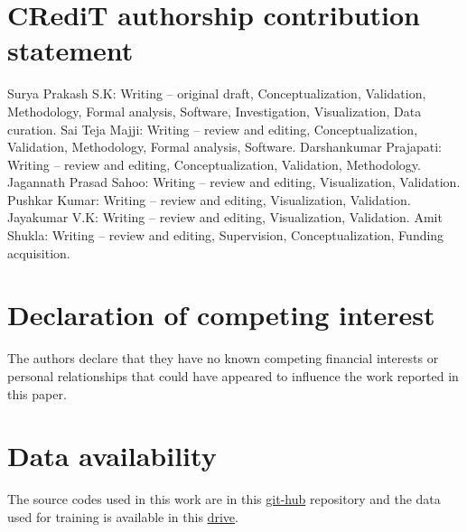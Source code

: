 \documentclass[preprint,12pt]{elsarticle}
\begin{document}
\section*{CRediT authorship contribution statement}
Surya Prakash S.K: Writing – original draft, Conceptualization, Validation, Methodology, Formal analysis, Software, Investigation, Visualization, Data curation. Sai Teja Majji: Writing – review and editing, Conceptualization, Validation, Methodology, Formal analysis, Software. Darshankumar Prajapati: Writing – review and editing, Conceptualization, Validation, Methodology. Jagannath Prasad Sahoo: Writing – review and editing, Visualization, Validation. Pushkar Kumar: Writing – review and editing, Visualization, Validation. Jayakumar V.K: Writing – review and editing, Visualization, Validation. Amit Shukla: Writing – review and editing, Supervision, Conceptualization, Funding acquisition.
\section*{Declaration of competing interest}
The authors declare that they have no known competing financial
interests or personal relationships that could have appeared to influence the work reported in this paper.
\section*{Data availability}
The source codes used in this work are in this \href{https://github.com/suryaroboticarm/Differential-Inverse-Kinematics-with-Coupled-Reward-Design}{git-hub} repository and the data used for training is available in this \href{https://drive.google.com/file/d/1BO6DrKE7GO-1D8vohWwWejpfg7DyryN8/view?usp=sharing}{drive}.





\end{document}
